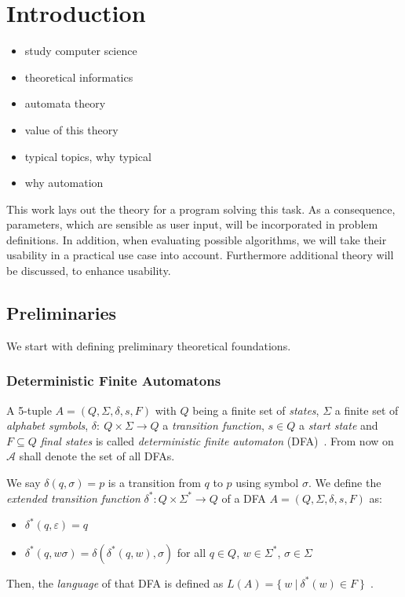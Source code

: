 
\chapter{Introduction}

\begin{itemize}
	\item study computer science
	\item theoretical informatics
	\item automata theory
	\item value of this theory
	\item typical topics, why typical
	\item why automation
\end{itemize}

This work lays out the theory for a program solving this task. As a consequence, parameters, which are sensible as user input, will be incorporated in problem definitions.
In addition, when evaluating possible algorithms, we will take their usability in a practical use case into account.
Furthermore additional theory will be discussed, to enhance usability.

\section{Preliminaries}

We start with defining preliminary theoretical foundations.

\subsection{Deterministic Finite Automatons}

A 5-tuple $A = (Q, \Sigma, \delta, s, F)$ with $Q$ being a finite set of \emph{states}, $\Sigma$ a finite set of \emph{alphabet symbols}, $\delta \colon\ Q \times \Sigma \to Q$ a \emph{transition function}, $s \in Q$ a \emph{start state} and $F \subseteq Q$ \emph{final states} is called \emph{deterministic finite automaton} (DFA)~\cite[p. 46]{hopcroft01}. From now on $\mathcal{A}$ shall denote the set of all DFAs.

We say $\delta(q,\sigma) = p$ is a transition from $q$ to $p$ using symbol $\sigma$. We define the \emph{extended transition function} $\delta^* : Q \times \Sigma^* \to Q$ of a DFA $A = (Q, \Sigma, \delta, s, F)$ as:
\begin{itemize}
	\item $\delta^*(q,\varepsilon) = q$
	\item $\delta^*(q,w\sigma) = \delta(\delta^*(q,w),\sigma)$ for all $q \in Q$, $w \in \Sigma^*$, $\sigma \in \Sigma$
\end{itemize}
Then, the \emph{language} of that DFA is defined as $L(A) = \{\ w\ |\ \delta^*(w) \in F\ \}$~\cite[pp. 49-50. 52]{hopcroft01}.

